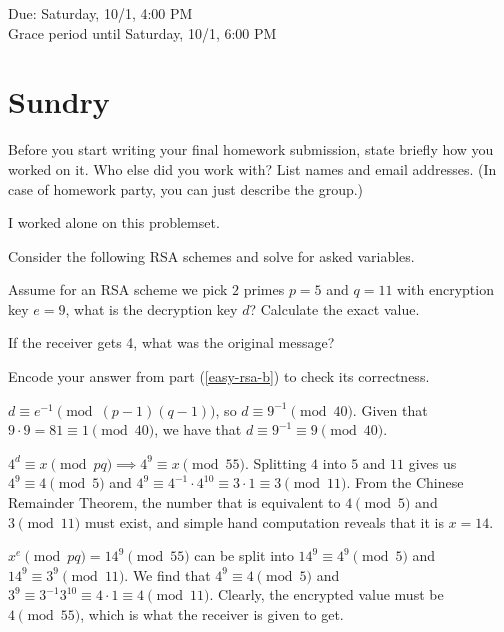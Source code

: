 \documentclass[11pt]{article}
\begin{document}
\maketitle
\fontsize{12}{15}\selectfont

\begin{center}
    Due: Saturday, 10/1, 4:00 PM \\
    Grace period until Saturday, 10/1, 6:00 PM \\
\end{center}

\section*{Sundry}
Before you start writing your final homework submission, state briefly how you worked on it.  Who else did you work with?  List names and email addresses.  (In case of homework party, you can just describe the group.)

\begin{solution}
    I worked alone on this problemset.
\end{solution}

\vspace{15pt}


Consider the following RSA schemes and solve for asked variables.
\begin{Parts}
 
    \Part Assume for an RSA scheme we pick $2$ primes $p = 5$ and $q = 11$ with encryption key $e = 9$, what is the decryption key $d$? Calculate the exact value.
    
    
    \Part If the receiver gets 4, what was the original message? \label{easy-rsa-b}
    
    
    \Part Encode your answer from part (\ref{easy-rsa-b}) to check its correctness.
    
\end{Parts}

\begin{solution}
    \begin{Parts}
        \Part $d \equiv e^{-1} \pmod{(p-1)(q-1)}$, so $d \equiv 9^{-1} \pmod {40}$. Given that $9 \cdot 9 = 81 \equiv 1 \pmod{40}$, we have that $d \equiv 9^{-1} \equiv \boxed{9} \pmod{40}$.
        
        \Part $4^d \equiv x \pmod{pq} \implies 4^9 \equiv x \pmod{55}$. Splitting $4$ into $5$ and $11$ gives us $4^9 \equiv 4 \pmod 5$ and $4^9 \equiv 4^{-1} \cdot 4^{10} \equiv 3 \cdot 1 \equiv 3 \pmod{11}$. From the Chinese Remainder Theorem, the number that is equivalent to $4 \pmod 5$ and $3 \pmod{11}$ must exist, and simple hand computation reveals that it is $x = \boxed{14}$.
        
        \Part $x^e \pmod{pq} = 14^9 \pmod{55}$ can be split into $14^9 \equiv 4^9 \pmod 5$ and $14^9 \equiv 3^9 \pmod{11}$. We find that $4^9 \equiv 4 \pmod{5}$ and $3^9 \equiv 3^{-1}3^{10} \equiv 4 \cdot 1 \equiv 4 \pmod{11}$. Clearly, the encrypted value must be $4 \pmod{55}$, which is what the receiver is given to get.
    \end{Parts}
\end{solution}
\end{document}
